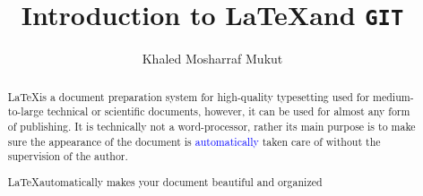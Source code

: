 \documentclass[a4paper, 12pt, one column]{article}
\title{Introduction to \LaTeX \space and \texttt{GIT}}
\author{Khaled Mosharraf Mukut}
\begin{document}
\maketitle

\begin{abstract}

    \LaTeX is a document preparation system for high-quality typesetting used for medium-to-large technical or scientific documents, however,  it can be used for almost any form of publishing. It is technically not a word-processor, rather its main purpose is to make sure the appearance of the document is \textcolor{blue}{automatically} taken care of without the supervision of the author. 
    
    \vspace{0.3cm}

     {
            {
            \begin{minipage}{0.8\textwidth}
                \centering
               \LaTeX \space automatically makes your document beautiful and organized 
            \end{minipage}
            }
        }

\end{abstract}
\end{document}
